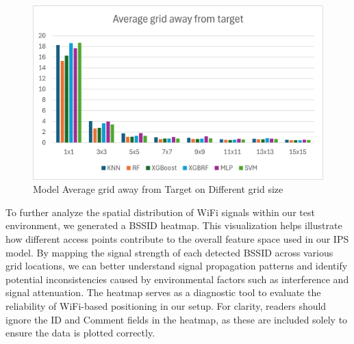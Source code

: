 \documentclass[conference]{IEEEtran}
\begin{document}
	\begin{figure}[htbp]
		\centerline{\includegraphics[scale=0.65]{image1.png}}
		\caption{Model Average grid away from Target on Different grid size}
		\label{fig4}
	\end{figure}
	
	To further analyze the spatial distribution of WiFi signals within our test environment, we generated a BSSID heatmap. This visualization helps illustrate how different access points contribute to the overall feature space used in our IPS model. By mapping the signal strength of each detected BSSID across various grid locations, we can better understand signal propagation patterns and identify potential inconsistencies caused by environmental factors such as interference and signal attenuation. The heatmap serves as a diagnostic tool to evaluate the reliability of WiFi-based positioning in our setup. For clarity, readers should ignore the ID and Comment fields in the heatmap, as these are included solely to ensure the data is plotted correctly.
	
\end{document}
